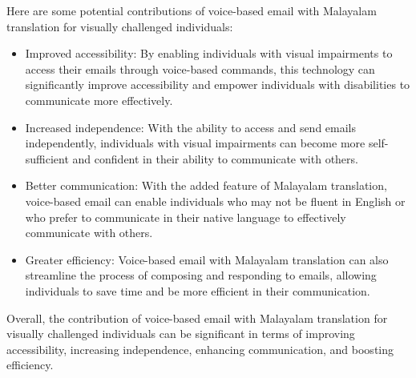 \documentclass[12pt]{report}
\begin{document}
Here are some potential contributions of voice-based email with Malayalam translation for visually challenged individuals:
\begin{itemize}
\item Improved accessibility: By enabling individuals with visual impairments to access their emails through voice-based commands, this technology can significantly improve accessibility and empower individuals with disabilities to communicate more effectively.

\item Increased independence: With the ability to access and send emails independently, individuals with visual impairments can become more self-sufficient and confident in their ability to communicate with others.

\item Better communication: With the added feature of Malayalam translation, voice-based email can enable individuals who may not be fluent in English or who prefer to communicate in their native language to effectively communicate with others.

\item Greater efficiency: Voice-based email with Malayalam translation can also streamline the process of composing and responding to emails, allowing individuals to save time and be more efficient in their communication.
\end{itemize}

Overall, the contribution of voice-based email with Malayalam translation for visually challenged individuals can be significant in terms of improving accessibility, increasing independence, enhancing communication, and boosting efficiency.\newpage

\end{document}
